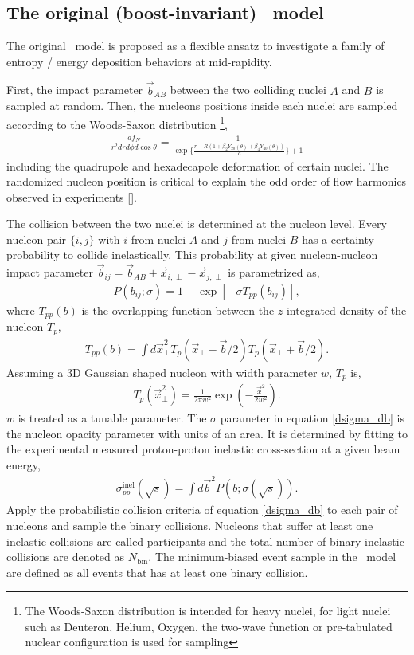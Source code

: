 \subsection{The original (boost-invariant) \trento\ model}
The original \trento\ model is proposed as a flexible ansatz to investigate a family of entropy / energy deposition behaviors at mid-rapidity.

First, the impact parameter $\vec{b}_{AB}$ between the two colliding nuclei $A$ and $B$ is sampled at random.
Then, the nucleons positions inside each nuclei are sampled according to the Woods-Saxon distribution \footnote{The Woods-Saxon distribution is intended for heavy nuclei, for light nuclei such as Deuteron, Helium, Oxygen, the two-wave function or pre-tabulated nuclear configuration is used for sampling},
\begin{eqnarray}
\frac{df_N}{r^2 dr d\phi d\cos\theta} = \frac{1}{\exp\{\frac{r-R(1+\beta_2 Y_{20}(\theta)+\beta_4 Y_{40}(\theta))}{a}\}+1}
\end{eqnarray}
including the quadrupole and hexadecapole deformation of certain nuclei.
The randomized nucleon position is critical to explain the odd order of flow harmonics observed in experiments [].

The collision between the two nuclei is determined at the nucleon level. 
Every nucleon pair $\{i, j\}$ with $i$ from nuclei $A$ and $j$ from nuclei $B$ has a certainty probability to collide inelastically.
This probability at given nucleon-nucleon impact parameter $\vec{b}_{ij} = \vec{b}_{AB} + \vec{x}_{i, \perp} -  \vec{x}_{j, \perp}$ is parametrized as,
\begin{eqnarray}
P(b_{ij}; \sigma) = 1 - \exp\left[-\sigma T_{pp}(b_{ij})\right],
\label{dsigma_db}
\end{eqnarray}
where $T_{pp}(b)$ is the overlapping function between the $z$-integrated density of the nucleon $T_p$,
\begin{eqnarray}
T_{pp}(b) = \int d\vec{x}_\perp^2 T_p(\vec{x}_\perp-\vec{b}/2) T_p(\vec{x}_\perp+\vec{b}/2).
\end{eqnarray}
Assuming a 3D Gaussian shaped nucleon with width parameter $w$, $T_p$ is, 
\begin{eqnarray}
T_p(\vec{x}_\perp^2) = \frac{1}{2\pi w^2} \exp\left(-\frac{\vec{x}^2}{2w^2}\right).
\end{eqnarray}
$w$ is treated as a tunable parameter.
The $\sigma$ parameter in equation \ref{dsigma_db} is the nucleon opacity parameter with units of an area.
It is determined by fitting to the experimental measured proton-proton inelastic cross-section at a given beam energy,
\begin{eqnarray}
\sigma_{pp}^\text{inel}(\sqrt{s}) = \int d\vec{b}^2 P(b; \sigma(\sqrt{s})).
\end{eqnarray}
Apply the probabilistic collision criteria of equation \ref{dsigma_db} to each pair of nucleons and sample the binary collisions. 
Nucleons that suffer at least one inelastic collisions are called participants and the total number of binary inelastic collisions are denoted as $N_{\textrm{bin}}$.
The minimum-biased event sample in the \trento\ model are defined as all events that has at least one binary collision.

